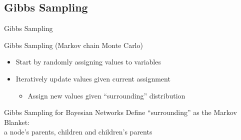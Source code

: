\documentclass[14pt]{beamer}
\begin{document}
\subsection{Gibbs Sampling}
\begin{frame}{Gibbs Sampling}
	\begin{block}{Gibbs Sampling (Markov chain Monte Carlo)}
		\begin{itemize}
			\item Start by randomly assigning values to variables
			\item Iteratively update values given current assignment
				\begin{itemize}
					\item Assign new values given ``surrounding'' distribution
				\end{itemize}
		\end{itemize}
	\end{block}
	\pause
	\begin{block}{Gibbs Sampling for Bayesian Networks}
		Define ``surrounding'' as the \alert{Markov Blanket}: \\
		\tab\tab a node's parents, children and children's parents
	\end{block}
\end{frame}
\end{document}
